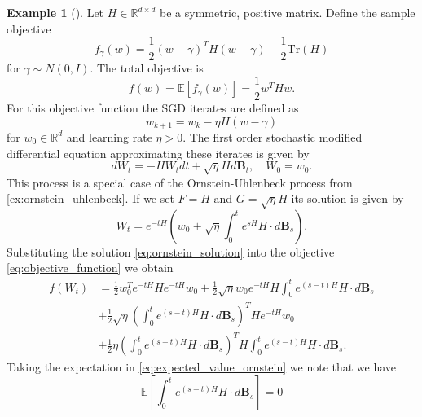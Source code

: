\documentclass[12pt]{article}
\theoremstyle{definition}
\newtheorem{example}[example]{Example}
\numberwithin{equation}{section}
\newcommand{\R}{\mathbb{R}}
\newcommand{\ev}[1]{\mathbb{E}\left[{#1}\right]}
\begin{document}
\begin{example}[\autocite{liStochasticModifiedEquations2019}]
  \label{ex:quadratic_smde}
  Let $H \in \R^{d\times d}$ be a symmetric, positive matrix. Define the sample objective 
\begin{equation*}
  f_{\gamma}(w) = \frac{1}{2} (w - \gamma)^T H (w - \gamma) - \frac{1}{2} \text{Tr}(H)
\end{equation*}
for $\gamma \sim N(0,I)$. The total objective is 
\begin{equation}
  \label{eq:objective_function}
  f(w) = \ev{f_{\gamma}(w)} = \frac{1}{2} w^T H w.
\end{equation}
For this objective function the SGD iterates are defined as
\begin{equation*}
  w_{k+1} = w_k - \eta H(w - \gamma)
\end{equation*}
for $w_0 \in \R^d$ and learning rate $\eta > 0$.
The first order stochastic modified differential equation approximating these iterates is given by
\begin{equation*}
  dW_t = -H W_t dt + \sqrt{\eta}H d\pmb{B}_t, \quad W_0 = w_0.
\end{equation*}
This process is a special case of the Ornstein-Uhlenbeck process from \autoref{ex:ornstein_uhlenbeck}. If we set $F = H$ and $G = \sqrt{\eta}H$ its solution is given by
\begin{equation}
  \label{eq:ornstein_solution}
  W_t = e^{-t H}\left(w_0 + \sqrt{\eta}\int_0^te^{s H}H \cdot d\pmb{B}_s\right).
\end{equation}
Substituting the solution \eqref{eq:ornstein_solution} into the objective \eqref{eq:objective_function} we obtain
\begin{equation}
  \label{eq:expected_value_ornstein}
  \begin{split}
    f(W_t) &= \frac{1}{2} w_0^T e^{-tH}He^{-tH}w_0 +
     \frac{1}{2} \sqrt{\eta}w_0e^{-tH}H\int_0^t e^{(s-t)H}H\cdot d\pmb{B}_s \\ 
    &+ \frac{1}{2} \sqrt{\eta}\left(\int_0^t e^{(s-t)H}H\cdot d\pmb{B}_s\right)^T He^{-tH}w_0 \\
    &+ \frac{1}{2} \eta \left(\int_0^t e^{(s-t)H}H\cdot d\pmb{B}_s\right)^T H\int_0^t e^{(s-t)H}H\cdot d\pmb{B}_s.
  \end{split}
\end{equation}
Taking the expectation in \eqref{eq:expected_value_ornstein} we note that we have
\begin{equation*}
  \ev{\int_0^t e^{(s-t)H}H\cdot d\pmb{B}_s} = 0

\end{equation*}
\end{example}
\end{document}
